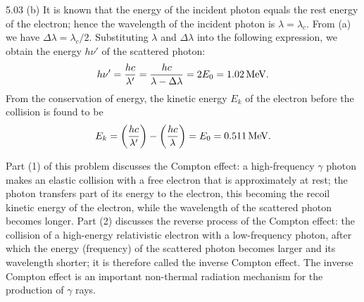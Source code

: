 \begin{solution}{5.03}
(b) It is known that the energy of the incident photon equals the rest energy of the electron;
hence the wavelength of the incident photon is $\lambda = \lambda_c$. From (a) we have
$\Delta\lambda = \lambda_c/2$. Substituting $\lambda$ and $\Delta\lambda$ into the following
expression, we obtain the energy $h\nu'$ of the scattered photon:
\begin{equation*}
h\nu' = \frac{hc}{\lambda'} = \frac{hc}{\lambda - \Delta\lambda} = 2E_0 = 1.02\,\mathrm{MeV}.
\end{equation*}
From the conservation of energy, the kinetic energy $E_k$ of the electron before the collision
is found to be
\begin{equation*}
E_k = \left(\frac{hc}{\lambda'}\right) - \left(\frac{hc}{\lambda}\right)
    = E_0 = 0.511\,\mathrm{MeV}.
\end{equation*}

\begin{commentary}
Part (1) of this problem discusses the Compton effect: a high-frequency $\gamma$ photon makes
an elastic collision with a free electron that is approximately at rest; the photon transfers
part of its energy to the electron, this becoming the recoil kinetic energy of the electron,
while the wavelength of the scattered photon becomes longer. Part (2) discusses the reverse
process of the Compton effect: the collision of a high-energy relativistic electron with a
low-frequency photon, after which the energy (frequency) of the scattered photon becomes
larger and its wavelength shorter; it is therefore called the inverse Compton effect. The
inverse Compton effect is an important non-thermal radiation mechanism for the production of
$\gamma$ rays.


\end{commentary}
\end{solution}

